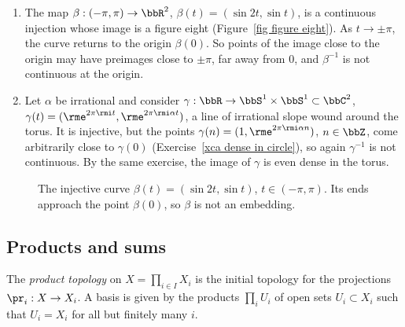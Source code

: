 \begin{example}\label{example not embeddings}
    \begin{enumerate}
        \item The map $\beta:(-\pi,\pi)\to\bbR^2$, $\beta(t)=(\sin 2t,\sin t)$, is a continuous injection whose image is a figure eight (Figure~\ref{fig figure eight}). As $t\to\pm\pi$, the curve returns to the origin $\beta(0)$. So points of the image close to the origin may have preimages close to $\pm\pi$, far away from $0$, and $\beta^{-1}$ is not continuous at the origin.
        \item Let $\alpha$ be irrational and consider $\gamma:\bbR\to\bbS^1\times\bbS^1\subset\bbC^2$, $\gamma(t)=(\rme^{2\pi\rmi t},\rme^{2\pi\rmi\alpha t})$, a line of irrational slope wound around the torus. It is injective, but the points $\gamma(n)=(1,\rme^{2\pi\rmi\alpha n})$, $n\in\bbZ$, come arbitrarily close to $\gamma(0)$ (Exercise~\ref{xca dense in circle}), so again $\gamma^{-1}$ is not continuous. By the same exercise, the image of $\gamma$ is even dense in the torus.
    \end{enumerate}
\end{example}

\begin{figure}[tp]
    \centering
    \caption{The injective curve $\beta(t)=(\sin2t,\sin t)$, $t\in(-\pi,\pi)$. Its ends approach the point $\beta(0)$, so $\beta$ is not an embedding.}
    \label{fig figure eight}\label{fig:immersion}
\end{figure}

\subsection{Products and sums}

\begin{defn}
    The \emph{product topology} on $X=\prod_{i\in I}X_i$ is the initial topology for the projections $\pr_i:X\to X_i$. A basis is given by the products $\prod_i U_i$ of open sets $U_i\subset X_i$ such that $U_i=X_i$ for all but finitely many $i$.
\end{defn}

